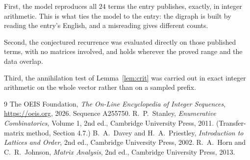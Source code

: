 \documentclass[11pt,a4paper]{article}
\theoremstyle{plain}
\theoremstyle{definition}
\begin{document}
First, the model reproduces all $24$ terms the entry publishes, exactly, in integer
arithmetic. This is what ties the model to the entry: the digraph is built by reading the
entry's English, and a misreading gives different counts.

Second, the conjectured recurrence was evaluated directly on those published terms, with no
matrices involved, and holds wherever the proved range and the data overlap.

Third, the annihilation test of Lemma~\ref{lem:crit} was carried out in exact integer
arithmetic on the whole vector rather than on a sampled prefix.

\begin{thebibliography}{9}
 The OEIS Foundation, \emph{The On-Line Encyclopedia of Integer
Sequences}, \url{https://oeis.org}, 2026. Sequence A255750.
 R.~P.~Stanley, \emph{Enumerative Combinatorics}, Volume 1, 2nd ed.,
Cambridge University Press, 2011. (Transfer-matrix method, Section 4.7.)
 B.~A.~Davey and H.~A.~Priestley, \emph{Introduction to Lattices and
Order}, 2nd ed., Cambridge University Press, 2002.
 R.~A.~Horn and C.~R.~Johnson, \emph{Matrix Analysis}, 2nd ed., Cambridge
University Press, 2013.
\end{thebibliography}
\end{document}
